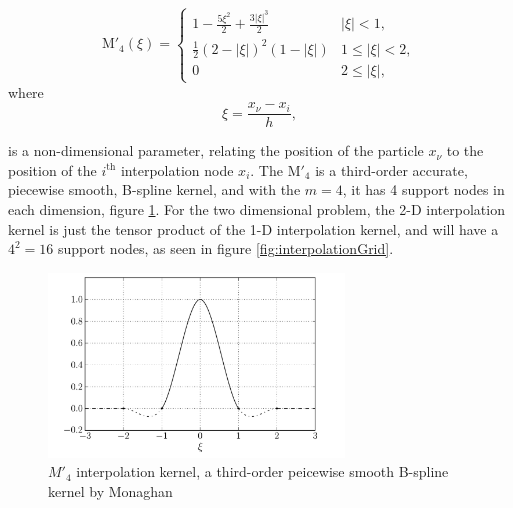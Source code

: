 	\begin{equation}
	{\mathrm{M'}_4}\left( {\xi} \right) =
	  \begin{cases}
	   {1 - \frac{{5{\xi ^2}}}{2} + \frac{{3{{\left| \xi  \right|}^3}}}{2}} & {\left| \xi \right|} < 1, \\
	   \frac{1}{2}{\left( {2 - \left| \xi  \right|} \right)^2}\left( {1 - \left| \xi  \right|} \right) & 1 \le {\left| \xi \right|} < 2,\\
	   0 & 2 \le \left| \xi \right|,
	  \end{cases}
	\label{eq:interpKernel}
	\end{equation}
where
	\begin{equation}
	\xi = \frac{x_{\nu} - x_i}{h},
	\label{eq:xiEquation}
	\end{equation}
	
is a non-dimensional parameter, relating the position of the particle $x_{\nu}$ to the position of the $i^{\mathrm{th}}$ interpolation node $x_i$. The $\mathrm{M'}_4$ is a third-order accurate, piecewise smooth, B-spline kernel, and with the $m = 4$, it has 4 support nodes in each dimension, figure \ref{fig:interpolationKernel}. For the two dimensional problem, the 2-D interpolation kernel is just the tensor product of the 1-D interpolation kernel, and will have a $4^2 = 16$ support nodes, as seen in figure \ref{fig:interpolationGrid}.

	\begin{figure}[t]
	\centering
	\includegraphics[width=0.7\textwidth]{figures/lagrangian/interpolationKernel.pdf}
	\caption{$M'_4$ interpolation kernel, a third-order peicewise smooth B-spline kernel by Monaghan \cite{Monaghan1985}}
	\label{fig:interpolationKernel}
	\end{figure}

%
%
%	

